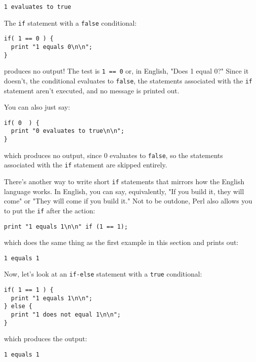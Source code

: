 \begin{lstlisting}
1 evaluates to true
\end{lstlisting}

The \verb|if| statement with a \verb|false| conditional: 

\begin{lstlisting}
if( 1 == 0 ) {
  print "1 equals 0\n\n";
}
\end{lstlisting}

produces no output! The test is \verb|1 == 0| or, in English, "Does 1 equal 0?" Since it doesn't, the conditional evaluates to \verb|false|, the statements associated with the \verb|if| statement aren't executed, and no message is printed out.

You can also just say:

\begin{lstlisting}
if( 0  ) {
  print "0 evaluates to true\n\n";
}
\end{lstlisting}

which produces no output, since 0 evaluates to \verb|false|, so the statements associated with the \verb|if| statement are skipped entirely. 

There's another way to write short \verb|if| statements that mirrors how the English language works. In English, you can say, equivalently, "If you build it, they will come" or "They will come if you build it." Not to be outdone, Perl also allows you to put the \verb|if| after the action:

\begin{lstlisting}
print "1 equals 1\n\n" if (1 == 1);
\end{lstlisting}

which does the same thing as the first example in this section and prints out:

\begin{lstlisting}
1 equals 1
\end{lstlisting}

Now, let's look at an \verb|if-else| statement with a \verb|true| conditional:

\begin{lstlisting}
if( 1 == 1 ) {
  print "1 equals 1\n\n";
} else {
  print "1 does not equal 1\n\n";
}
\end{lstlisting}

which produces the output:

\begin{lstlisting}
1 equals 1
\end{lstlisting}

